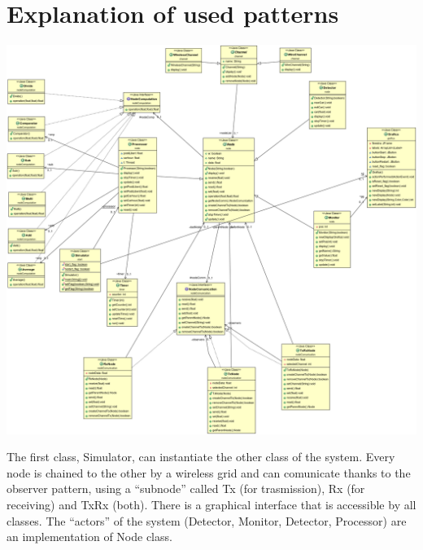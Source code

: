 \documentclass[a4paper,titlepage]{article}
\begin{document}
\newpage
\section*{Explanation of used patterns}

    \begin{center}

    \centering
    \includegraphics[scale=0.30]{ClassDiagram.png}

    \end{center}


The first class, Simulator, can instantiate the other class of the system. Every node is chained to the other by a wireless grid and can comunicate thanks to the observer pattern, using a ``subnode'' called Tx (for trasmission), Rx (for receiving) and TxRx (both). There is a graphical interface that is accessible by all classes. The ``actors'' of the system (Detector, Monitor, Detector, Processor) are an implementation of Node class.
\end{document}
